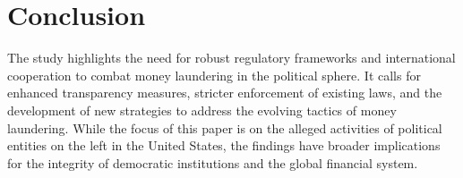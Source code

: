 \documentclass{article}
\begin{document}
\section{Conclusion}
The study highlights the need for robust regulatory frameworks and international cooperation to combat money laundering in the political sphere. It calls for enhanced transparency measures, stricter enforcement of existing laws, and the development of new strategies to address the evolving tactics of money laundering. While the focus of this paper is on the alleged activities of political entities on the left in the United States, the findings have broader implications for the integrity of democratic institutions and the global financial system.
\end{document}
